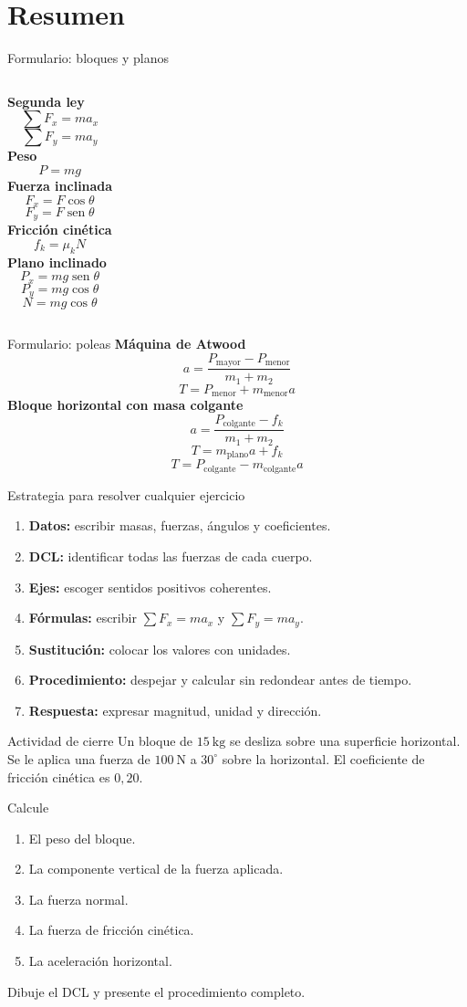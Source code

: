 \documentclass[aspectratio=169,11pt]{beamer}
\begin{document}
\section{Resumen}
\begin{frame}{Formulario: bloques y planos}
\begin{columns}[T]
\textbf{Segunda ley}
\[\sum F_x=ma_x\]
\[\sum F_y=ma_y\]
\textbf{Peso}
\[P=mg\]
\textbf{Fuerza inclinada}
\[F_x=F\cos\theta\]
\[F_y=F\operatorname{sen}\theta\]
\textbf{Fricción cinética}
\[f_k=\mu_kN\]
\textbf{Plano inclinado}
\[P_x=mg\operatorname{sen}\theta\]
\[P_y=mg\cos\theta\]
\[N=mg\cos\theta\]
\end{columns}
\end{frame}
\begin{frame}{Formulario: poleas}
\textbf{Máquina de Atwood}
\[a=\frac{P_{\mathrm{mayor}}-P_{\mathrm{menor}}}{m_1+m_2}\]
\[T=P_{\mathrm{menor}}+m_{\mathrm{menor}}a\]
\vspace{.2cm}
\textbf{Bloque horizontal con masa colgante}
\[a=\frac{P_{\mathrm{colgante}}-f_k}{m_1+m_2}\]
\[T=m_{\mathrm{plano}}a+f_k\]
\[T=P_{\mathrm{colgante}}-m_{\mathrm{colgante}}a\]
\end{frame}
\begin{frame}{Estrategia para resolver cualquier ejercicio}
\begin{enumerate}
\item \textbf{Datos:} escribir masas, fuerzas, ángulos y coeficientes.
\item \textbf{DCL:} identificar todas las fuerzas de cada cuerpo.
\item \textbf{Ejes:} escoger sentidos positivos coherentes.
\item \textbf{Fórmulas:} escribir \(\sum F_x=ma_x\) y \(\sum F_y=ma_y\).
\item \textbf{Sustitución:} colocar los valores con unidades.
\item \textbf{Procedimiento:} despejar y calcular sin redondear antes de tiempo.
\item \textbf{Respuesta:} expresar magnitud, unidad y dirección.
\end{enumerate}
\end{frame}
\begin{frame}{Actividad de cierre}
Un bloque de \(15\ \mathrm{kg}\) se desliza sobre una superficie horizontal. Se le aplica una fuerza de \(100\ \mathrm{N}\) a \(30^\circ\) sobre la horizontal. El coeficiente de fricción cinética es \(0{,}20\).
\begin{block}{Calcule}
\begin{enumerate}
\item El peso del bloque.
\item La componente vertical de la fuerza aplicada.
\item La fuerza normal.
\item La fuerza de fricción cinética.
\item La aceleración horizontal.
\end{enumerate}
\end{block}
Dibuje el DCL y presente el procedimiento completo.
\end{frame}
\end{document}
